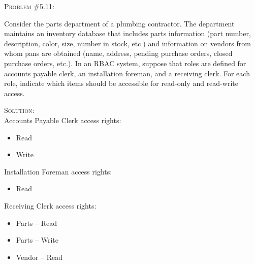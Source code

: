 \documentclass[12pt]{article}
\newenvironment{problem}[1]
{\begin{mdframed}[linewidth=0.8pt]
        \textsc{Problem #1:}

}
    {\end{mdframed}}
\newenvironment{solution}
    {\textsc{Solution:}\\}
    {\newpage}%
\begin{document}
	\begin{problem}{\#5.11}
		Consider the parts department of a plumbing contractor.
		The department maintains an inventory database that includes parts
		information (part number, description, color, size, number in stock,
		etc.) and information on vendors from whom pans are obtained (name,
		address, pending purchase orders, closed purchase orders, etc.). In
		an RBAC system, suppose that roles are defined for accounts payable
		clerk, an installation foreman, and a receiving clerk. For each role,
		indicate which items should be accessible for read-only and read-write
		access.
	\end{problem}
	\begin{solution}
		Accounts Payable Clerk access rights:
		\begin{itemize}
			\item Read
			\item Write
		\end{itemize}
		Installation Foreman access rights:
		\begin{itemize}
			\item Read
		\end{itemize}
		Receiving Clerk access rights:
		\begin{itemize}
			\item Parts -- Read
			\item Parts -- Write
			\item Vendor -- Read
		\end{itemize}
	\end{solution}
\end{document}
